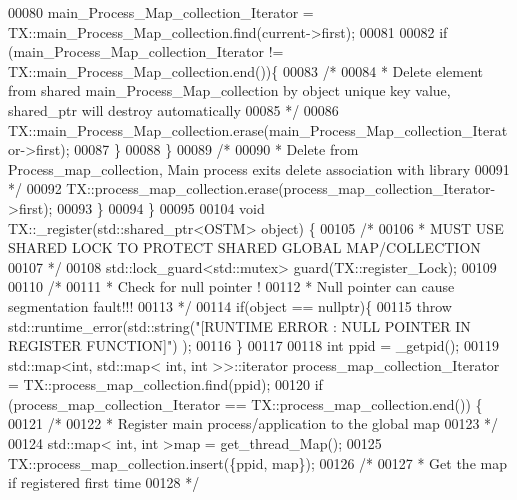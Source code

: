 \begin{DoxyCode}
00080             main\_Process\_Map\_collection\_Iterator = TX::main\_Process\_Map\_collection.find(current->first);
00081 
00082             \textcolor{keywordflow}{if} (main\_Process\_Map\_collection\_Iterator != TX::main\_Process\_Map\_collection.end())\{
00083                 \textcolor{comment}{/*}
00084 \textcolor{comment}{                 * Delete element from shared main\_Process\_Map\_collection by object unique key value,
       shared\_ptr will destroy automatically}
00085 \textcolor{comment}{                 */}
00086                 TX::main\_Process\_Map\_collection.erase(main\_Process\_Map\_collection\_Iterator->first);      
00087             \}
00088         \}
00089         \textcolor{comment}{/*}
00090 \textcolor{comment}{         * Delete from Process\_map\_collection, Main process exits delete association with library}
00091 \textcolor{comment}{         */}
00092         TX::process\_map\_collection.erase(process\_map\_collection\_Iterator->first);
00093     \}
00094 \}
00095 
00104 \textcolor{keywordtype}{void} TX::\_register(std::shared\_ptr<OSTM> \textcolor{keywordtype}{object}) \{
00105     \textcolor{comment}{/*}
00106 \textcolor{comment}{     * MUST USE SHARED LOCK TO PROTECT SHARED GLOBAL MAP/COLLECTION }
00107 \textcolor{comment}{     */}
00108     std::lock\_guard<std::mutex> guard(TX::register\_Lock);
00109     
00110     \textcolor{comment}{/*}
00111 \textcolor{comment}{     * Check for null pointer !}
00112 \textcolor{comment}{     * Null pointer can cause segmentation fault!!!}
00113 \textcolor{comment}{     */}
00114     \textcolor{keywordflow}{if}(\textcolor{keywordtype}{object} == \textcolor{keyword}{nullptr})\{
00115         \textcolor{keywordflow}{throw} std::runtime\_error(std::string(\textcolor{stringliteral}{"[RUNTIME ERROR : NULL POINTER IN REGISTER FUNCTION]"}) );
00116     \}
00117     
00118     \textcolor{keywordtype}{int} ppid = \_getpid();
00119     std::map<int, std::map< int, int >>::iterator process\_map\_collection\_Iterator = 
      TX::process\_map\_collection.find(ppid);
00120     \textcolor{keywordflow}{if} (process\_map\_collection\_Iterator == TX::process\_map\_collection.end()) \{
00121         \textcolor{comment}{/*}
00122 \textcolor{comment}{         * Register main process/application to the global map}
00123 \textcolor{comment}{         */}
00124         std::map< int, int >map =  get\_thread\_Map();
00125         TX::process\_map\_collection.insert(\{ppid, map\});
00126         \textcolor{comment}{/*}
00127 \textcolor{comment}{         * Get the map if registered first time}
00128 \textcolor{comment}{         */}

\end{DoxyCode}
